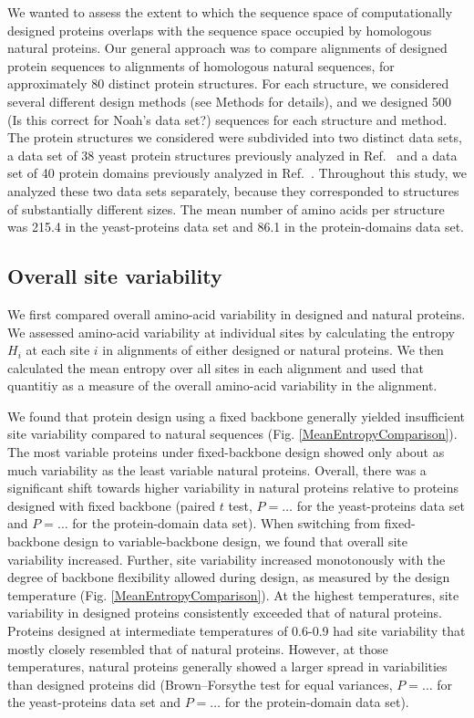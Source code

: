 \documentclass[12pt]{article}
\begin{document}
We wanted to assess the extent to which the sequence space of computationally designed proteins overlaps with the sequence space occupied by homologous natural proteins. Our general approach was to compare alignments of designed protein sequences to alignments of homologous natural sequences, for approximately 80 distinct protein structures. For each structure, we considered several different design methods (see Methods for details), and we designed 500 {\color{red}(Is this correct for Noah's data set?)} sequences for each structure and method. The protein structures we considered were subdivided into two distinct data sets, a data set of 38 yeast protein structures previously analyzed in Ref.\ \cite{Ramsey2011} and a data set of 40 protein domains previously analyzed in  Ref.\ \cite{OllikainenKortemme}. Throughout this study, we analyzed these two data sets separately, because they corresponded to structures of substantially different sizes. The mean number of amino acids per structure was 215.4 in the yeast-proteins data set and 86.1 in the protein-domains data set.

\subsection{Overall site variability}
\label{SiteVariability}

We first compared overall amino-acid variability in designed and natural proteins. We assessed amino-acid variability at individual sites by calculating the entropy $H_i$ at each site $i$ in alignments of either designed or natural proteins. We then calculated the mean entropy over all sites in each alignment and used that quantitiy as a measure of the overall amino-acid variability in the alignment.

We found that protein design using a fixed backbone generally yielded insufficient site variability compared to natural sequences (Fig. \ref{MeanEntropyComparison}). The most variable proteins under fixed-backbone design showed only about as much variability as the least variable natural proteins. Overall, there was a significant shift towards higher variability in natural proteins relative to proteins designed with fixed backbone (paired $t$ test, {\color{red}$P=\dots$} for the yeast-proteins data set and {\color{red}$P=\dots$} for the protein-domain data set). When switching from fixed-backbone design to variable-backbone design, we found that overall site variability increased. Further, site variability increased monotonously with the degree of backbone flexibility allowed during design, as measured by the design temperature (Fig. \ref{MeanEntropyComparison}). At the highest temperatures, site variability in designed proteins consistently exceeded that of natural proteins. Proteins designed at intermediate temperatures of 0.6-0.9 had site variability that mostly closely resembled that of natural proteins. However, at those temperatures, natural proteins generally showed a larger spread in variabilities than designed proteins did (Brown–Forsythe test for equal variances, {\color{red}$P=\dots$} for the yeast-proteins data set and {\color{red}$P=\dots$} for the protein-domain data set).
\end{document}
